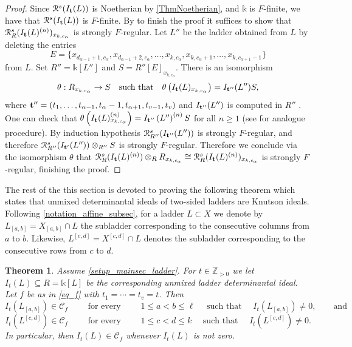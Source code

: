 \documentclass[12pt]{amsart}
\renewcommand{\leq}{\leqslant}
\renewcommand{\geq}{\geqslant}
\newtheorem{theorem}{Theorem}[section]
\theoremstyle{definition}
\newcommand{\R}[1]{R^{1/p^{#1}}}
\renewcommand{\(}{\left(}
\renewcommand{\)}{\right)}
\newcommand{\ZZ}{\mathbb{Z}}
\newcommand{\kk}{\mathbb{k}}
\newcommand{\cR}{\mathcal{R}}
\def \R{\mathcal R}
\renewcommand{\!}[1]{{\color{red}\text{\Huge$\star$ }#1}}
\newcommand{\ttt}{{\bf t}}
\begin{document}
\begin{proof}
Since $\R^s(I_\ttt(L))$ is Noetherian by \autoref{ThmNoetherian}, and $\kk$ is $F$-finite, we have that $\R^s(I_\ttt(L))$ is $F$-finite. By  \cite[Theorem 3.3]{HHStrongFreg} to finish the proof it suffices to show that $\cR^s_R(I_{\ttt}(L)^{(n)})_{x_{k,c_\alpha}}$ is strongly $F$-regular. Let $L''$ be the ladder obtained from $L$ by deleting the entries $$E=\{x_{d_{\alpha-1}+1,c_\alpha},x_{d_{\alpha-1}+2,c_\alpha},\ldots,x_{k,c_\alpha},x_{k,c_\alpha+1},\ldots,x_{k,c_{\alpha+1}-1}\}$$ from $L$. Set $R''=\mathbb{k}[L'']$ and $S=R''[E]_{x_{k,c_\alpha}}$.  There is an isomorphism 
  $$\theta:R_{x_{k,c_\alpha}} \to S 
\quad \text{such that} 
\quad 
\theta\left(I_\ttt(L)_{x_{k,c_\alpha}}\right) = I_{\ttt''}(L'')S,
  $$ 
  where $\ttt''=(t_1,\ldots,t_{\alpha -1},t_\alpha -1,t_{\alpha +1}, t_{v-1},t_v)$ and $I_{\ttt''}(L'')$ is computed in $R''$  \cite[Lemma 1.19]{GorlaMixed}. One can check that  $\theta\left(I_\ttt(L)^{(n)}_{x_{k,c_\alpha}}\right) = I_{\ttt''}\left(L''\right)^{(n)}S$ for all $n \geq 1$ (see \cite[Lemma 10.1]{BookDet} for analogue procedure). By induction hypothesis  $\cR^s_{R''}(I_{\ttt''}(L''))$ is strongly $F$-regular, and therefore $\cR^s_{R''}(I_{\ttt'}(L'')) \otimes_{R''} S$ is strongly $F$-regular. Therefore we conclude via the  isomorphism $\theta$ that $\cR^s_R(I_{\ttt}(L)^{(n)}) \otimes_R R_{x_{k,c_\alpha}} \cong \cR^s_R(I_{\ttt}(L)^{(n)})_{x_{k,c_\alpha}}$ is strongly $F$-regular, finishing the proof.
\end{proof}




The rest of the this section is devoted to proving the following theorem which states  that unmixed determinantal ideals of two-sided ladders are Knutson ideals. Following \autoref{notation_affine_subsec}, for a ladder $L\subset X$ we denote by  $L_{[a,b]}=X_{[a,b]} \cap L$ the  subladder corresponding to the  consecutive columns from $a$ to $b$. Likewise,  $L^{[c,d]}=X^{[c,d]} \cap L$ denotes the subladder corresponding to the  consecutive rows from $c$ to $d$. 

\begin{theorem}\label{ThmLadderKI}
Assume \autoref{setup_mainsec_ladder}. For $t \in \ZZ_{>0}$  we let $I_t(L) \subseteq R=\mathbb{k}[L]$ be the corresponding unmixed ladder determinantal ideal. Let 
 $f$ be as in \autoref{eq_f} with $t_1=\cdots =t_v=t$. Then $$I_t\left(L_{[a,b]}\right) \in \mathcal{C}_f \qquad 
\text{ for every } \qquad 1\leq a < b\leq \ell \quad \text{ such that } \quad I_t\left(L_{[a,b]}\right)\neq 0,\qquad \text{and}$$   $$I_t\left(L^{[c,d]}\right) \in \mathcal{C}_f \qquad  
\text{ for every } \qquad 1\leq c < d\leq k \quad \text{ such that } \quad I_t\left(L^{[c,d]}\right)\neq 0.$$
In particular, then $ I_t(L)\in \mathcal{C}_f$ whenever $I_t(L)$ is not zero.
\end{theorem}
\end{document}

